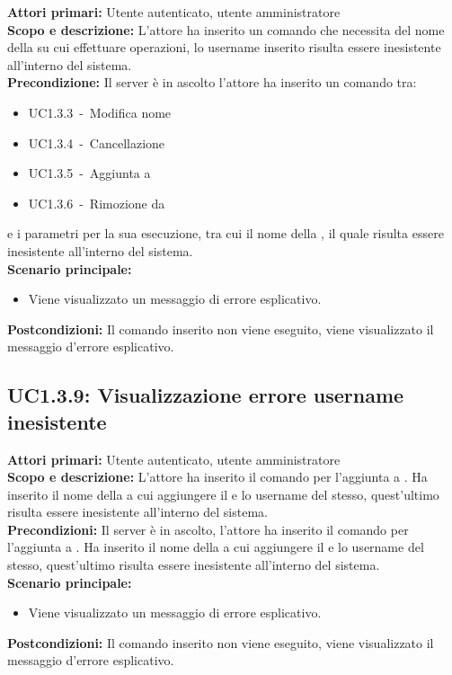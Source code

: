 \documentclass{scalatekids-article}
\begin{document}
\textbf{Attori primari:} Utente autenticato, utente amministratore\\
\textbf{Scopo e descrizione:} L'attore ha inserito un comando che necessita del nome della  su cui effettuare operazioni, lo username inserito risulta essere inesistente all'interno del sistema.\\
\textbf{Precondizione:}
Il server è in ascolto l'attore ha inserito un comando tra:
\begin{itemize}
\item UC1.3.3\ -\ Modifica nome 
\item UC1.3.4\ -\ Cancellazione 
\item UC1.3.5\ -\ Aggiunta  a 
\item UC1.3.6\ -\ Rimozione  da 
\end{itemize}
e i parametri per la sua esecuzione, tra cui il nome della , il quale risulta essere inesistente all'interno del sistema.\\
\textbf{Scenario principale:}
\begin{itemize}
\item Viene visualizzato un messaggio di errore esplicativo.
\end{itemize}
\textbf{Postcondizioni:} Il comando inserito non viene eseguito, viene visualizzato il messaggio d'errore esplicativo.

\subsection{UC1.3.9: Visualizzazione errore username inesistente}
\textbf{Attori primari:} Utente autenticato, utente amministratore\\
\textbf{Scopo e descrizione:}
L'attore ha inserito il comando per l'aggiunta  a
. Ha inserito il nome della  a cui
aggiungere il  e lo username del  stesso, quest'ultimo risulta essere inesistente all'interno
del sistema.\\
\textbf{Precondizioni:} Il server è in ascolto, l'attore ha inserito il comando per l'aggiunta  a
. Ha inserito il nome della  a cui
aggiungere il  e lo username del
 stesso, quest'ultimo risulta essere inesistente all'interno del sistema.\\
\textbf{Scenario principale:}
\begin{itemize}
\item Viene visualizzato un messaggio di errore esplicativo.
\end{itemize}
\textbf{Postcondizioni:} Il comando inserito non viene eseguito, viene visualizzato il messaggio d'errore esplicativo.
\end{document}
